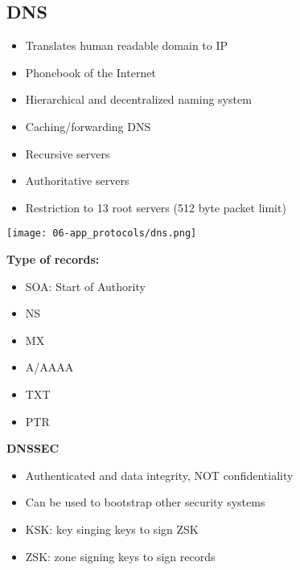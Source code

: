 \subsection{DNS}
\begin{itemize}
    \item Translates human readable domain to IP
    \item Phonebook of the Internet
    \item Hierarchical and decentralized naming system
    \item Caching/forwarding DNS
    \item Recursive servers
    \item Authoritative servers
    \item Restriction to 13 root servers (512 byte packet limit)
\end{itemize}

\begin{center}
    \texttt{[image: 06-app\_protocols/dns.png]}
\end{center}
\textbf{Type of records:}
\begin{itemize}
    \item SOA: Start of Authority
    \item NS
    \item MX
    \item A/AAAA
    \item TXT
    \item PTR
\end{itemize}
\textbf{DNSSEC}
\begin{itemize}
    \item Authenticated and data integrity, NOT confidentiality
    \item Can be used to bootstrap other security systems
    \item KSK: key singing keys to sign ZSK
    \item ZSK: zone signing keys to sign records
\end{itemize}

